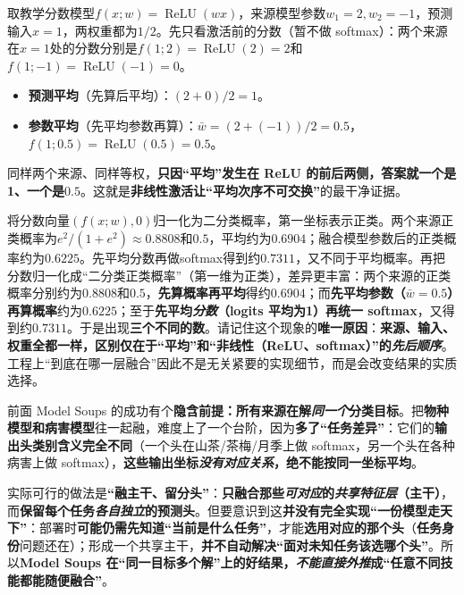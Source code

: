 \begin{example}[非线性使两种平均不相等]
  \label{ex:ket-integration-nonlinear-average}
  取教学分数模型$f(x;w)=\operatorname{ReLU}(wx)$，来源模型参数$w_1=2,w_2=-1$，预测输入$x=1$，两权重都为$1/2$。先只看激活前的分数（暂不做 softmax）：两个来源在$x=1$处的分数分别是$f(1;2)=\operatorname{ReLU}(2)=2$和$f(1;-1)=\operatorname{ReLU}(-1)=0$。
\begin{itemize}\item \textbf{预测平均}（先算后平均）：$(2+0)/2=1$。\item \textbf{参数平均}（先平均参数再算）：$\bar w=(2+(-1))/2=0.5$，$f(1;0.5)=\operatorname{ReLU}(0.5)=0.5$。\end{itemize}
同样两个来源、同样等权，\textbf{只因“平均”发生在 ReLU 的前后两侧，答案就一个是1、一个是$0.5$}。这就是\textbf{非线性激活让“平均次序不可交换”}的最干净证据。

  将分数向量$(f(x;w),0)$归一化为二分类概率，第一坐标表示正类。两个来源正类概率为$e^2/(1+e^2)\approx0.8808$和$0.5$，平均约为$0.6904$；融合模型参数后的正类概率约为$0.6225$。先平均分数再做softmax得到约$0.7311$，又不同于平均概率。再把分数归一化成“二分类正类概率”（第一维为正类），差异更丰富：两个来源的正类概率分别约为$0.8808$和$0.5$，\textbf{先算概率再平均}得约$0.6904$；而\textbf{先平均参数（$\bar w=0.5$）再算概率}约为$0.6225$；至于\textbf{先平均\emph{分数}（logits 平均为1）再统一 softmax}，又得到约$0.7311$。于是出现\textbf{三个不同的数}。请记住这个现象的\textbf{唯一原因}：\textbf{来源、输入、权重全都一样，区别仅在于“平均”和“非线性（ReLU、softmax）”的\emph{先后顺序}}。工程上“到底在哪一层融合”因此不是无关紧要的实现细节，而是会改变结果的实质选择。
\end{example}

前面 Model Soups 的成功有个\textbf{隐含前提：所有来源在解\emph{同一个}分类目标}。把\textbf{物种模型和病害模型}往一起融，难度上了一个台阶，因为\textbf{多了“任务差异”}：它们的\textbf{输出头类别含义完全不同}（一个头在山茶/茶梅/月季上做 softmax，另一个头在各种病害上做 softmax），\textbf{这些输出坐标\emph{没有对应关系}，绝不能按同一坐标平均}。

实际可行的做法是\textbf{“融主干、留分头”}：\textbf{只融合那些\emph{可对应}的\emph{共享特征层}（主干）}，而\textbf{保留每个任务\emph{各自独立}的预测头}。但要意识到这\textbf{并没有完全实现“一份模型走天下”}：部署时\textbf{可能仍需先知道“当前是什么任务”}，才能\textbf{选用对应的那个头}（\textbf{任务身份}问题还在）；形成一个共享主干，\textbf{并不自动解决“面对未知任务该选哪个头”}。所以\textbf{Model Soups 在“同一目标多个解”上的好结果，\emph{不能直接外推}成“任意不同技能都能随便融合”}。

